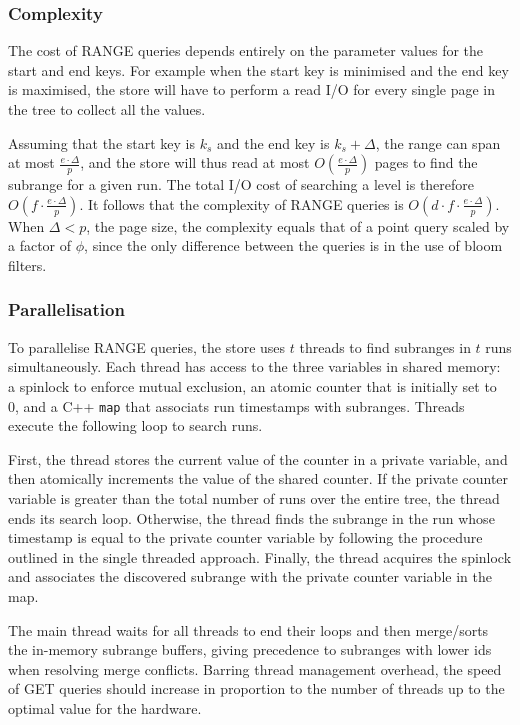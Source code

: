 \documentclass{acm}
\begin{document}
\subsubsection{Complexity}

The cost of RANGE queries depends entirely on the parameter values for the start and end keys. For example when the start key is minimised and the end key is maximised, the store will have to perform a read I/O for every single page in the tree to collect all the values.

Assuming that the start key is $k_s$ and the end key is $k_s + \Delta$, the range can span at most $ \frac{e \cdot \Delta}{p}$, and the store will thus read at most $O(\frac{e \cdot \Delta}{p})$ pages to find the subrange for a given run. The total I/O cost of searching a level is therefore $O(f \cdot \frac{e \cdot \Delta}{p})$. It follows that the complexity of RANGE queries is $O(d \cdot f \cdot \frac{e \cdot \Delta}{p})$. When $\Delta < p$, the page size, the complexity equals that of a point query scaled by a factor of $\phi$, since the only difference between the queries is in the use of bloom filters.

\subsubsection{Parallelisation}

To parallelise RANGE queries, the store uses $t$ threads to find subranges in $t$ runs simultaneously. Each thread has access to the three variables in shared memory: a spinlock to enforce mutual exclusion, an atomic counter that is initially set to 0, and a C++ \texttt{map} that associats run timestamps with subranges. Threads execute the following loop to search runs.

First, the thread stores the current value of the counter in a private variable, and then atomically increments the value of the shared counter. If the private counter variable is greater than the total number of runs over the entire tree, the thread ends its search loop. Otherwise, the thread finds the subrange in the run whose timestamp is equal to the private counter variable by following the procedure outlined in the single threaded approach. Finally, the thread acquires the spinlock and associates the discovered subrange with the private counter variable in the map. 

The main thread waits for all threads to end their loops and then merge/sorts the in-memory subrange buffers, giving precedence to subranges with lower ids when resolving merge conflicts. Barring thread management overhead, the speed of GET queries should increase in proportion to the number of threads up to the optimal value for the hardware.
\end{document}
